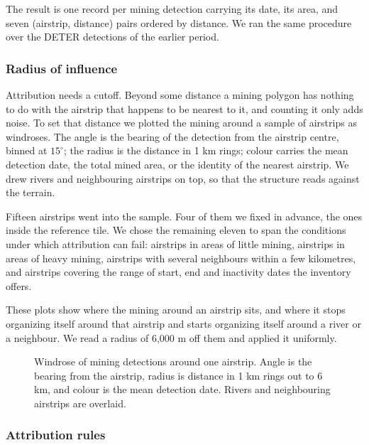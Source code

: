 \documentclass[11pt]{article}
\begin{document}
The result is one record per mining detection carrying its date, its area, and seven (airstrip, distance) pairs ordered by distance. We ran the same procedure over the DETER detections of the earlier period.

\subsubsection{Radius of influence}

Attribution needs a cutoff. Beyond some distance a mining polygon has nothing to do with the airstrip that happens to be nearest to it, and counting it only adds noise. To set that distance we plotted the mining around a sample of airstrips as windroses. The angle is the bearing of the detection from the airstrip centre, binned at $15^\circ$; the radius is the distance in 1 km rings; colour carries the mean detection date, the total mined area, or the identity of the nearest airstrip. We drew rivers and neighbouring airstrips on top, so that the structure reads against the terrain.

Fifteen airstrips went into the sample. Four of them we fixed in advance, the ones inside the reference tile. We chose the remaining eleven to span the conditions under which attribution can fail: airstrips in areas of little mining, airstrips in areas of heavy mining, airstrips with several neighbours within a few kilometres, and airstrips covering the range of start, end and inactivity dates the inventory offers.

These plots show where the mining around an airstrip sits, and where it stops organizing itself around that airstrip and starts organizing itself around a river or a neighbour. We read a radius of 6{,}000 m off them and applied it uniformly.


\begin{figure}[htbp]
\centering
\caption{Windrose of mining detections around one airstrip. Angle is the bearing from the airstrip, radius is distance in 1 km rings out to 6 km, and colour is the mean detection date. Rivers and neighbouring airstrips are overlaid.}
\label{fig:windrose}
\end{figure}

\subsubsection{Attribution rules}
\end{document}
